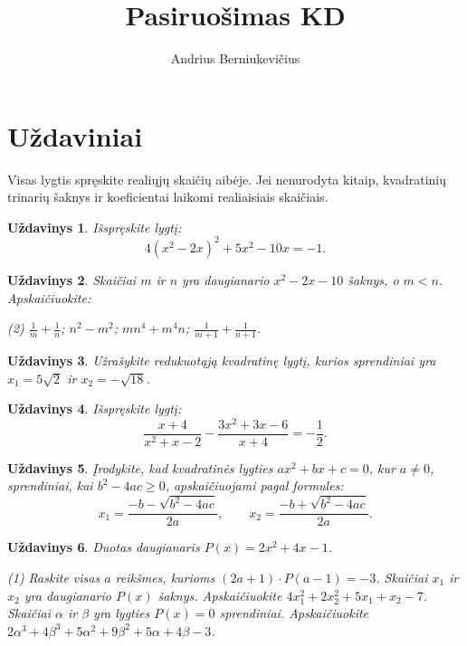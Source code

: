 \documentclass[11pt,a4paper]{scrartcl}
\title{Pasiruošimas KD}
\author{Andrius Berniukevičius}
\date{}
\newtheorem{problem}{Uždavinys}
\begin{document}
\maketitle

\section{Uždaviniai}
Visas lygtis spręskite realiųjų skaičių aibėje. Jei nenurodyta kitaip,
kvadratinių trinarių šaknys ir koeficientai laikomi realiaisiais skaičiais.

\begin{problem}
Išspręskite lygtį:
$$ 4\left(x^2-2x\right)^2+5x^2-10x=-1. $$
\end{problem}

\begin{problem}
Skaičiai $m$ ir $n$ yra daugianario $x^2-2x-10$ šaknys, o $m<n$.
Apskaičiuokite:
\begin{tasks}(2)
    \task $\frac{1}{m}+\frac{1}{n}$;
    \task $n^2-m^2$;
    \task $mn^4+m^4n$;
    \task $\frac{1}{m+1}+\frac{1}{n+1}$.
\end{tasks}
\end{problem}

\begin{problem}
Užrašykite redukuotąją kvadratinę lygtį, kurios sprendiniai yra
$x_1=5\sqrt{2}$ ir $x_2=-\sqrt{18}$.
\end{problem}

\begin{problem}
Išspręskite lygtį:
$$ \frac{x+4}{x^2+x-2}-\frac{3x^2+3x-6}{x+4}=-\frac{1}{2}. $$
\end{problem}

\begin{problem}
Įrodykite, kad kvadratinės lygties $ax^2+bx+c=0$, kur $a\ne0$,
sprendiniai, kai $b^2-4ac\ge0$, apskaičiuojami pagal formules:
$$ x_1=\frac{-b-\sqrt{b^2-4ac}}{2a},\qquad
   x_2=\frac{-b+\sqrt{b^2-4ac}}{2a}. $$
\end{problem}

\begin{problem}
Duotas daugianaris $P(x)=2x^2+4x-1$.
\begin{tasks}(1)
    \task Raskite visas $a$ reikšmes, kurioms
    $(2a+1)\cdot P(a-1)=-3$.
    \task Skaičiai $x_1$ ir $x_2$ yra daugianario $P(x)$ šaknys.
    Apskaičiuokite $4x_1^2+2x_2^2+5x_1+x_2-7$.
    \task Skaičiai $\alpha$ ir $\beta$ yra lygties $P(x)=0$ sprendiniai.
    Apskaičiuokite
    $2\alpha^3+4\beta^3+5\alpha^2+9\beta^2+5\alpha+4\beta-3$.
\end{tasks}
\end{problem}
\end{document}
